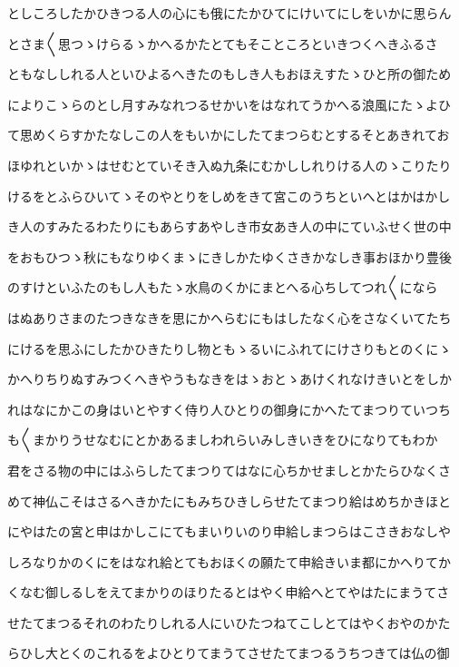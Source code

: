 \documentclass[a4paper,11pt,landscape]{ltjtarticle}
\begin{document}
としころしたかひきつる人の心にも俄にたかひてにけいてにしをいかに思らん
\par\medskip
とさま〱思つゝけらるゝかへるかたとてもそこところといきつくへきふるさ
\par\medskip
ともなししれる人といひよるへきたのもしき人もおほえすたゝひと所の御ため
\par\medskip
によりこゝらのとし月すみなれつるせかいをはなれてうかへる浪風にたゝよひ
\par\medskip
て思めくらすかたなしこの人をもいかにしたてまつらむとするそとあきれてお
\par\medskip
ほゆれといかゝはせむとていそき入ぬ九条にむかししれりける人のゝこりたり
\par\medskip
けるをとふらひいてゝそのやとりをしめをきて宮このうちといへとはかはかし
\par\medskip
き人のすみたるわたりにもあらすあやしき市女あき人の中にていふせく世の中
\par\medskip
をおもひつゝ秋にもなりゆくまゝにきしかたゆくさきかなしき事おほかり豊後
\par\medskip
のすけといふたのもし人もたゝ水鳥のくかにまとへる心ちしてつれ〱になら
\par\medskip
はぬありさまのたつきなきを思にかへらむにもはしたなく心をさなくいてたち
\par\medskip
にけるを思ふにしたかひきたりし物ともゝるいにふれてにけさりもとのくにゝ
\par\medskip
かへりちりぬすみつくへきやうもなきをはゝおとゝあけくれなけきいとをしか
\par\medskip
れはなにかこの身はいとやすく侍り人ひとりの御身にかへたてまつりていつち
\par\medskip
も〱まかりうせなむにとかあるましわれらいみしきいきをひになりてもわか
\par\medskip
君をさる物の中にはふらしたてまつりてはなに心ちかせましとかたらひなくさ
\par\medskip
めて神仏こそはさるへきかたにもみちひきしらせたてまつり給はめちかきほと
\par\medskip
にやはたの宮と申はかしこにてもまいりいのり申給しまつらはこさきおなしや
\par\medskip
しろなりかのくにをはなれ給とてもおほくの願たて申給きいま都にかへりてか
\par\medskip
くなむ御しるしをえてまかりのほりたるとはやく申給へとてやはたにまうてさ
\par\medskip
せたてまつるそれのわたりしれる人にいひたつねてこしとてはやくおやのかた
\par\medskip
らひし大とくのこれるをよひとりてまうてさせたてまつるうちつきては仏の御
\end{document}
